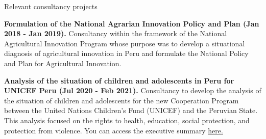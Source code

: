 \documentclass{resume} %
\begin{document}
\begin{rSection}{Relevant consultancy projects}
\vspace{-1.25em}
\item \textbf{Formulation of the National Agrarian Innovation Policy and Plan (Jan 2018 - Jan 2019).} {Consultancy within the framework of the National Agricultural Innovation Program whose purpose was to develop a situational diagnosis of agricultural innovation in Peru and formulate the National Policy and Plan for Agricultural Innovation.}
\item \textbf{Analysis of the situation of children and adolescents in Peru for UNICEF Peru (Jul 2020 - Feb 2021).} {Consultancy to develop the analysis of the situation of children and adolescents for the new Cooperation Program between the United Nations Children's Fund (UNICEF) and the Peruvian State. This analysis focused on the rights to health, education, social protection, and protection from violence. You can access the executive summary \href{https://www.unicef.org/peru/media/12141/file/Resumen Ejecutivo: Situaci%C3%B3n de ni%C3%B1as, ni%C3%B1os y adolescentes en el Per%C3%BA .pdf}{here.}}

\end{rSection}
\end{document}
